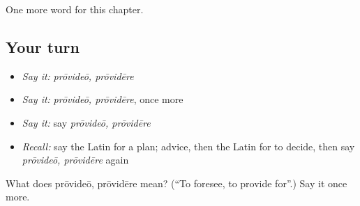 \begin{grammarlens}[title={What you've built}]
One more word for this chapter.
\end{grammarlens}

\subsection*{Your turn}
\begin{itemize}
\raggedright
  \item \emph{Say it:} \emph{prōvideō, prōvidēre}
  \item \emph{Say it:} \emph{prōvideō, prōvidēre}, once more
  \item \emph{Say it:} say \emph{prōvideō, prōvidēre}
  \item \emph{Recall:} say the Latin for a plan; advice, then the Latin for to decide, then say \emph{prōvideō, prōvidēre} again
\end{itemize}

\begin{tcolorbox}[breakable,colback=teal!4,colframe=teal!35!black,title={Before you move on}]
What does prōvideō, prōvidēre mean? (\textquotedblleft{}To foresee, to provide for\textquotedblright{}.) Say it once more.
\end{tcolorbox}
